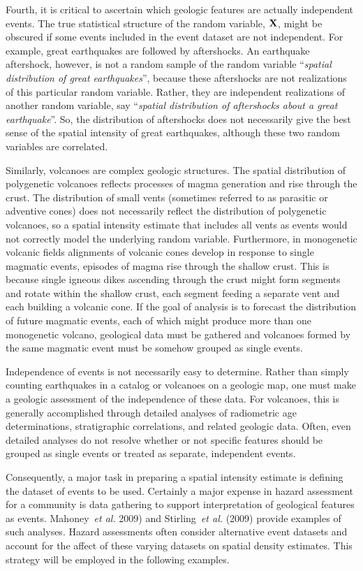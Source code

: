 \documentclass[10pt]{article}
\begin{document}
Fourth, it is critical to ascertain which geologic features are actually independent events. The true statistical structure of the random variable, $\bf{X}$, might be obscured if some events included in the event dataset are not independent.  For example, great earthquakes are followed by aftershocks. An earthquake aftershock, however, is not a random sample of the random variable ``{\it spatial distribution of great earthquakes}'', because these aftershocks are not realizations of this particular random variable. Rather, they are independent realizations of another random variable, say ``{\it spatial distribution of aftershocks about a great earthquake}''. So, the distribution of aftershocks does not necessarily give the best sense of the spatial intensity of great earthquakes, although these two random variables are correlated.

Similarly, volcanoes are complex geologic structures. The spatial distribution of polygenetic volcanoes reflects processes of magma generation and rise through the crust. The distribution of small vents (sometimes referred to as parasitic or adventive cones) does not necessarily reflect the distribution of polygenetic volcanoes, so a spatial intensity estimate that includes all vents as events would not correctly model the underlying random variable. Furthermore, in monogenetic volcanic fields  alignments of volcanic cones develop in response to single magmatic events,  episodes of magma rise through the shallow crust. This is because single igneous dikes ascending through the crust might form segments and rotate within the shallow crust, each segment feeding a separate vent and each building a volcanic cone.  If the goal of analysis is to forecast the distribution of future magmatic events, each of which might produce more than one monogenetic volcano, geological data must be gathered and volcanoes formed by the same magmatic event must be somehow grouped as single events.

Independence of events is not necessarily easy to determine. Rather than simply counting earthquakes in a catalog or volcanoes on a geologic map, one must make a geologic assessment of the independence of these data. For volcanoes, this is generally accomplished through detailed analyses of radiometric age determinations, stratigraphic correlations, and related geologic data. Often, even detailed analyses do not resolve whether or not specific features should be grouped as single events or treated as separate, independent events.

Consequently, a major task in preparing a spatial intensity estimate is defining the dataset of events to be used. Certainly a major expense in hazard assessment for a community is data gathering to support interpretation of geological features as events. Mahoney~{\it et al.} 2009) and Stirling~{\it et al.} (2009) provide examples of such analyses. Hazard assessments often consider alternative event datasets and account for the affect of these varying datasets on spatial density estimates. This strategy will be employed in the following examples.
\end{document}
